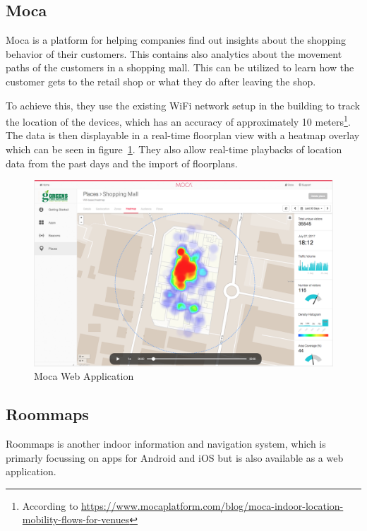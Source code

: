 \subsection{Moca}

Moca is a platform for helping companies find out insights about the shopping behavior of their customers. This contains also analytics about the movement paths of the customers in a shopping mall. 
This can be utilized to learn how the customer gets to the retail shop or what they do after leaving the shop.

To achieve this, they use the existing WiFi network setup in the building to track the location of the devices, which has an accuracy of approximately 10 meters\footnote{According to  \url{https://www.mocaplatform.com/blog/moca-indoor-location-mobility-flows-for-venues}}. The data is then displayable in a real-time floorplan view with a heatmap overlay which can be seen in figure~\ref{fig:MocaApplication}. They also allow real-time playbacks of location data from the past days and the import of floorplans.

\begin{figure}[!hb]
    \centering
    \includegraphics[width=0.9\linewidth]{images/Moca}
    \caption{Moca Web Application}
    \label{fig:MocaApplication}
\end{figure}

\clearpage

\subsection{Roommaps}

Roommaps is another indoor information and navigation system, which is primarly focussing on apps for Android and iOS but is also available as a web application.

